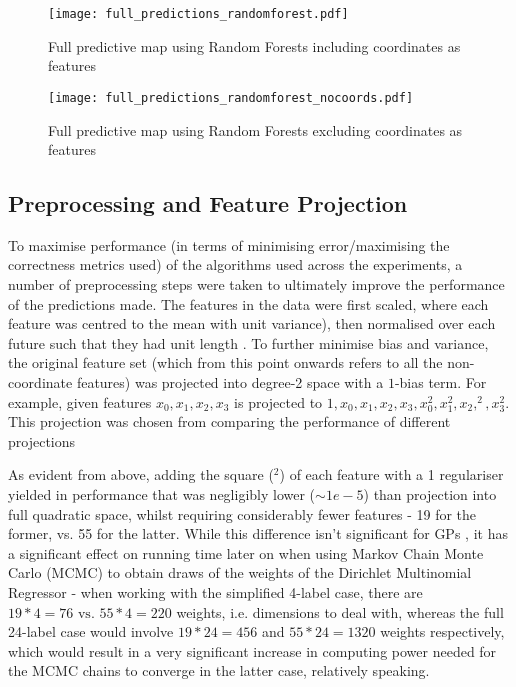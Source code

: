 
\begin{figure}[H]
    \begin{minipage}{.49\linewidth}
        \texttt{[image: full\_predictions\_randomforest.pdf]}
        \caption{Full predictive map using Random Forests including coordinates as features}
        \label{fig:rf_w_coords_preds}
    \end{minipage}
    \hfill
    \begin{minipage}{.49\linewidth}
        \texttt{[image: full\_predictions\_randomforest\_nocoords.pdf]}
        \caption{Full predictive map using Random Forests excluding coordinates as features}
        \label{fig:rf_wo_coords_preds}
    \end{minipage}
\end{figure}

\subsection{Preprocessing and Feature Projection}
To maximise performance (in terms of minimising error/maximising the correctness metrics used) of the algorithms used across the experiments, a number of preprocessing steps were taken to ultimately improve the performance of the predictions made. The features in the data were first scaled, where each feature was centred to the mean with unit variance), then normalised over each future such that they had unit length . To further minimise bias and variance, the original feature set (which from this point onwards refers to all the non-coordinate features) was projected into degree-2 space with a $1$-bias term. For example, given features $x_0, x_1, x_2, x_3$ is projected to $1, x_0, x_1, x_2, x_3, x_0^2, x_1^2, x_2,^2, x_3^2$. This projection was chosen from comparing the performance of different projections



As evident from above, adding the square ($^2$) of each feature with a 1 regulariser  yielded in performance that was negligibly lower ($\sim 1e-5$) than projection into full quadratic space, whilst requiring considerably fewer features - 19 for the former, vs. 55 for the latter. While this difference isn't significant for GPs , it has a significant effect on running time later on when using Markov Chain Monte Carlo (MCMC) to obtain draws of the weights of the Dirichlet Multinomial Regressor - when working with the simplified 4-label case, there are $19*4 =76 \text{ vs. } 55*4=220$ weights, i.e. dimensions to deal with, whereas the full 24-label case would involve $19*24=456$ and $55*24=1320$ weights respectively, which would result in a very significant increase in computing power needed for the MCMC chains to converge in the latter case, relatively speaking.

